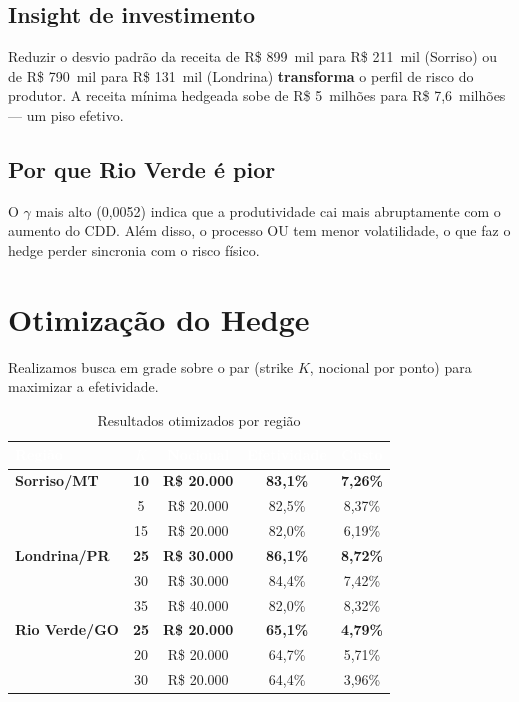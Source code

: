\documentclass[11pt,a4paper]{article}
\newcommand{\destaque}[1]{\textcolor{wolf_blue}{\textbf{#1}}}
\begin{document}
\subsection*{Insight de investimento}
Reduzir o desvio padrão da receita de R\$ 899~mil para R\$ 211~mil (Sorriso)
ou de R\$ 790~mil para R\$ 131~mil (Londrina) \destaque{transforma} o perfil
de risco do produtor. A receita mínima hedgeada sobe de R\$ 5~milhões para
R\$ 7,6~milhões --- um piso efetivo.

\subsection*{Por que Rio Verde é pior}
O $\gamma$ mais alto (0,0052) indica que a produtividade cai mais abruptamente
com o aumento do CDD\@. Além disso, o processo OU tem menor volatilidade, o que
faz o hedge perder sincronia com o risco físico.


\section{Otimização do Hedge}

Realizamos busca em grade sobre o par (strike $K$, nocional por ponto) para
maximizar a efetividade.

\begin{table}[htbp]
\centering
\caption{Resultados otimizados por região}
\label{tab:otimizado}
\small
\begin{tabular}{lcccc}
\toprule
\rowcolor{wolf_blue}\textcolor{white}{\textbf{Região}} &
\textcolor{white}{$K$} &
\textcolor{white}{\textbf{Nocional}} &
\textcolor{white}{\textbf{Efetividade}} &
\textcolor{white}{\textbf{Custo}} \\
\midrule
\rowcolor{wolf_lightgreen}
\textbf{Sorriso/MT} & \textbf{10} & \textbf{R\$ 20.000} & \textbf{83,1\%} & \textbf{7,26\%} \\
& 5  & R\$ 20.000 & 82,5\% & 8,37\% \\
& 15 & R\$ 20.000 & 82,0\% & 6,19\% \\
\midrule
\rowcolor{wolf_lightgreen}
\textbf{Londrina/PR} & \textbf{25} & \textbf{R\$ 30.000} & \textbf{86,1\%} & \textbf{8,72\%} \\
& 30 & R\$ 30.000 & 84,4\% & 7,42\% \\
& 35 & R\$ 40.000 & 82,0\% & 8,32\% \\
\midrule
\rowcolor{wolf_lightgreen}
\textbf{Rio Verde/GO} & \textbf{25} & \textbf{R\$ 20.000} & \textbf{65,1\%} & \textbf{4,79\%} \\
& 20 & R\$ 20.000 & 64,7\% & 5,71\% \\
& 30 & R\$ 20.000 & 64,4\% & 3,96\% \\
\bottomrule
\end{tabular}
\end{table}
\end{document}
